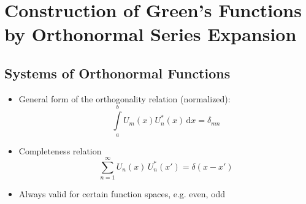 \section{Construction of Green's Functions by Orthonormal Series Expansion}
\subsection{Systems of Orthonormal Functions}
\begin{itemize}
        \item General form of the orthogonality relation (normalized):
\begin{equation*}
  \int\limits_{a}^{b}U_{m}(x)U_{n}^{*}(x)\,\mathrm{d}x = \delta_{mn}
\end{equation*}
  \item Completeness relation
        \begin{equation*}
          \sum\limits_{n=1}^{\infty} U_{n}(x)\,U^{*}_{n}(x') = \delta(x - x')
        \end{equation*}
  \item Always valid for certain function spaces, e.g. even, odd
\end{itemize}

